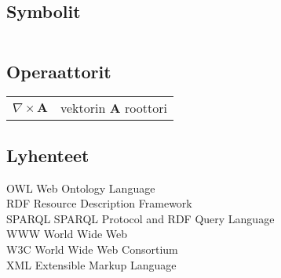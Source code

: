 \documentclass[finnish, 12pt, a4paper, elec, utf8, pdfa, online]{aaltothesis}
\begin{document}
\newpage


\thesistableofcontents



\subsection*{Symbolit}

\begin{tabular}{ll}
\end{tabular}

\subsection*{Operaattorit}

\begin{tabular}{ll}
$\nabla \times \mathbf{A}$              & vektorin $\mathbf{A}$ roottori\\
\end{tabular}

\subsection*{Lyhenteet}

OWL          Web Ontology Language \\
RDF          Resource Description Framework \\
SPARQL       SPARQL Protocol and RDF Query Language \\
WWW          World Wide Web \\
W3C          World Wide Web Consortium \\
XML          Extensible Markup Language \\

\begin{tabular}{ll}

\end{tabular}


\cleardoublepage

\end{document}
